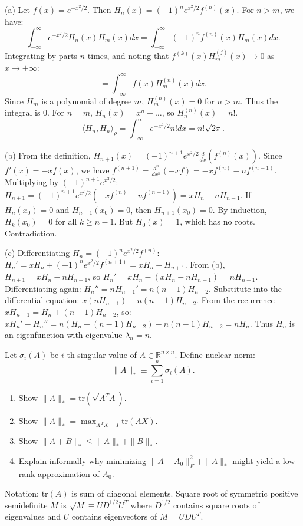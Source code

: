 \begin{solution}
(a) Let $f(x) = e^{-x^2/2}$. Then $H_n(x) = (-1)^n e^{x^2/2} f^{(n)}(x)$.
For $n > m$, we have:
\[
\int_{-\infty}^{\infty} e^{-x^2/2} H_n(x) H_m(x) dx = \int_{-\infty}^{\infty} (-1)^n f^{(n)}(x) H_m(x) dx.
\]
Integrating by parts $n$ times, and noting that $f^{(k)}(x) H_m^{(j)}(x) \to 0$ as $x \to \pm \infty$:
\[
= \int_{-\infty}^{\infty} f(x) H_m^{(n)}(x) dx.
\]
Since $H_m$ is a polynomial of degree $m$, $H_m^{(n)}(x) = 0$ for $n > m$. Thus the integral is 0.
For $n=m$, $H_n(x) = x^n + \dots$, so $H_n^{(n)}(x) = n!$.
\[
\langle H_n, H_n \rangle_\rho = \int_{-\infty}^{\infty} e^{-x^2/2} n! dx = n! \sqrt{2\pi}.
\]

(b) From the definition, $H_{n+1}(x) = (-1)^{n+1} e^{x^2/2} \frac{d}{dx} (f^{(n)}(x))$.
Since $f'(x) = -x f(x)$, we have $f^{(n+1)} = \frac{d^n}{dx^n} (-xf) = -x f^{(n)} - n f^{(n-1)}$.
Multiplying by $(-1)^{n+1} e^{x^2/2}$:
$H_{n+1} = (-1)^{n+1} e^{x^2/2} (-x f^{(n)} - n f^{(n-1)}) = x H_n - n H_{n-1}$.
If $H_n(x_0) = 0$ and $H_{n-1}(x_0) = 0$, then $H_{n+1}(x_0) = 0$. By induction, $H_k(x_0) = 0$ for all $k \geq n-1$. But $H_0(x) = 1$, which has no roots. Contradiction.

(c) Differentiating $H_n = (-1)^n e^{x^2/2} f^{(n)}$:
$H_n' = x H_n + (-1)^n e^{x^2/2} f^{(n+1)} = x H_n - H_{n+1}$.
From (b), $H_{n+1} = x H_n - n H_{n-1}$, so $H_n' = x H_n - (x H_n - n H_{n-1}) = n H_{n-1}$.
Differentiating again: $H_n'' = n H_{n-1}' = n(n-1) H_{n-2}$.
Substitute into the differential equation: $x(n H_{n-1}) - n(n-1) H_{n-2}$.
From the recurrence $x H_{n-1} = H_n + (n-1) H_{n-2}$, so:
$x H_n' - H_n'' = n(H_n + (n-1)H_{n-2}) - n(n-1) H_{n-2} = n H_n$.
Thus $H_n$ is an eigenfunction with eigenvalue $\lambda_n = n$.
\end{solution}

\begin{exercise}
\label{applied:2018:5}
Let $\sigma_{i}(A)$ be $i$-th singular value of $A\in\mathbb{R}^{n\times n}$. Define nuclear norm:
\[
\|A\|_{*}\equiv\sum_{i=1}^{n}\sigma_{i}(A).
\]

\begin{enumerate}
\item[(1)] Show $\|A\|_{*}=\mathrm{tr}(\sqrt{A^{T}A})$.
\item[(2)] Show $\|A\|_{*}=\max_{X^{T}X=I}\mathrm{tr}(AX)$.
\item[(3)] Show $\|A+B\|_{*}\leq\|A\|_{*}+\|B\|_{*}$.
\item[(4)] Explain informally why minimizing $\|A-A_{0}\|_{F}^{2}+\|A\|_{*}$ might yield a low-rank approximation of $A_{0}$.
\end{enumerate}

Notation: $\mathrm{tr}(A)$ is sum of diagonal elements. Square root of symmetric positive semidefinite $M$ is $\sqrt{M}\equiv UD^{1/2}U^{T}$ where $D^{1/2}$ contains square roots of eigenvalues and $U$ contains eigenvectors of $M=UDU^{T}$.
\end{exercise}

